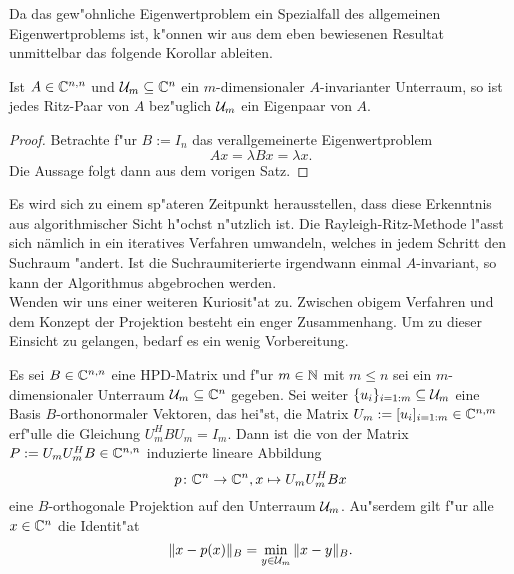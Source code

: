 Da das gew"ohnliche Eigenwertproblem ein Spezialfall des allgemeinen Eigenwertproblems
ist, k"onnen wir aus dem eben bewiesenen Resultat unmittelbar das folgende Korollar
ableiten.

\begin{kor}
Ist $A\in\mathbb{C}^{n,n}$ und $\mathcal{U}_m\subseteq \mathbb{C}^n$ ein $m$-dimensionaler $A$-invarianter Unterraum, so ist
jedes Ritz-Paar von $A$ bez"uglich $\mathcal{U}_m$ ein Eigenpaar von $A$.
\end{kor}

\begin{proof}
Betrachte f"ur $B:=I_n$ das verallgemeinerte Eigenwertproblem
\[
Ax = \lambda Bx = \lambda x.
\]
Die Aussage folgt dann aus dem vorigen Satz.
\end{proof}

Es wird sich zu einem sp"ateren Zeitpunkt herausstellen, dass diese Erkenntnis aus algorithmischer Sicht h"ochst n"utzlich ist.
Die Rayleigh-Ritz-Methode l"asst sich nämlich in ein iteratives Verfahren umwandeln, welches in jedem Schritt den Suchraum "andert. Ist die Suchraumiterierte irgendwann einmal $A$-invariant, so kann der Algorithmus abgebrochen werden.\\

Wenden wir uns einer weiteren Kuriosit"at zu. Zwischen obigem Verfahren und dem Konzept der Projektion besteht ein enger Zusammenhang.
Um zu dieser Einsicht zu gelangen, bedarf es ein wenig
Vorbereitung.
\begin{thm}\label{thm:projektor}
Es sei $B\in\mathbb{C}^{n,n}$ eine HPD-Matrix und f"ur $m\in\mathbb{N}$ mit $m\le n$ sei
ein $m$-dimensionaler Unterraum $\mathcal{U}_m \subseteq \mathbb{C}^n$ gegeben. Sei weiter $\{u_i\}_{i=1:m}\subseteq\mathcal{U}_m$ eine
Basis $B$-orthonormaler Vektoren, das hei"st, die Matrix $U_m := [u_i]_{i=1:m}
\in\mathbb{C}^{n,m}$ erf"ulle die Gleichung $U_m^H B U_m = I_m$. Dann ist die von der Matrix
 $P := U_m U_m^H B \in \mathbb{C}^{n,n}$ induzierte lineare Abbildung
\[
p \colon \mathbb{C}^n \to \mathbb{C}^n, x\mapsto U_m U_m^H Bx
\]
eine $B$-orthogonale Projektion auf den Unterraum $\mathcal{U}_m$. Au"serdem gilt
f"ur alle $x\in\mathbb{C}^n$ die Identit"at
\[
\|x-p(x)\|_B = \min_{y\in\mathcal{U}_m} \|x - y\|_B.
\]
\end{thm}

